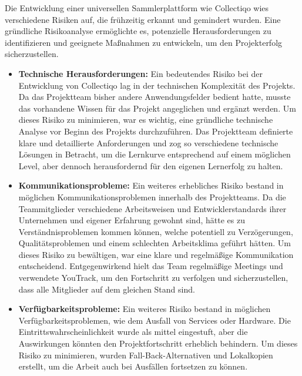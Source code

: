 Die Entwicklung einer universellen Sammlerplattform wie Collectiqo wies verschiedene Risiken auf, die frühzeitig erkannt und gemindert wurden.
Eine gründliche Risikoanalyse ermöglichte es, potenzielle Herausforderungen zu identifizieren und geeignete Maßnahmen zu entwickeln, um den Projekterfolg sicherzustellen.

\begin{itemize}[itemsep=1em, leftmargin=*]
    \item \textbf{Technische Herausforderungen:} Ein bedeutendes Risiko bei der Entwicklung von Collectiqo lag in der technischen Komplexität des Projekts.
    Da das Projektteam bisher andere Anwendungsfelder bedient hatte, musste das vorhandene Wissen für das Projekt angeglichen und ergänzt werden.
    Um dieses Risiko zu minimieren, war es wichtig, eine gründliche technische Analyse vor Beginn des Projekts durchzuführen.
    Das Projektteam definierte klare und detaillierte Anforderungen und zog so verschiedene technische Lösungen in Betracht, um die Lernkurve entsprechend auf einem möglichen Level, aber dennoch herausfordernd für den eigenen Lernerfolg zu halten.

    \item \textbf{Kommunikationsprobleme:} Ein weiteres erhebliches Risiko bestand in möglichen Kommunikationsproblemen innerhalb des Projektteams.
    Da die Teammitglieder verschiedene Arbeitsweisen und Entwicklerstandards ihrer Unternehmen und eigener Erfahrung gewohnt sind, hätte es zu Verständnisproblemen kommen können, welche potentiell zu Verzögerungen, Qualitätsproblemen und einem schlechten Arbeitsklima geführt hätten.
    Um dieses Risiko zu bewältigen, war eine klare und regelmäßige Kommunikation entscheidend.
    Entgegenwirkend hielt das Team regelmäßige Meetings und verwendete YouTrack, um den Fortschritt zu verfolgen und sicherzustellen, dass alle Mitglieder auf dem gleichen Stand sind.

    \item \textbf{Verfügbarkeitsprobleme:} Ein weiteres Risiko bestand in möglichen Verfügbarkeitsproblemen, wie dem Ausfall von Services oder Hardware.
    Die Eintrittswahrscheinlichkeit wurde als mittel eingestuft, aber die Auswirkungen könnten den Projektfortschritt erheblich behindern.
    Um dieses Risiko zu minimieren, wurden Fall-Back-Alternativen und Lokalkopien erstellt, um die Arbeit auch bei Ausfällen fortsetzen zu können.
\end{itemize}


